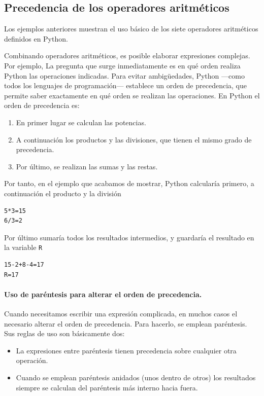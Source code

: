 \begin{paracol}{2}
\subsection{Precedencia de los operadores aritméticos}
Los ejemplos anteriores muestran el uso básico de los siete operadores aritméticos definidos en Python. 
 
Combinando operadores aritméticos, es posible elaborar expresiones complejas. Por ejemplo,
La pregunta que surge inmediatamente es en qué orden realiza Python las operaciones indicadas. Para evitar ambigüedades, Python ---como todos los lenguajes de programación--- establece un orden de precedencia, que permite saber exactamente en qué orden se realizan las operaciones. En Python el orden de precedencia es:
\begin{enumerate}
\item En primer lugar se calculan las potencias.
\item A continuación los productos y las divisiones, que tienen el mismo grado de precedencia.
\item Por último, se realizan las sumas y las restas. 
\end{enumerate} 

Por tanto, en el ejemplo que acabamos de mostrar, Python calcularía primero,
a continuación el producto y la división
\begin{verbatim}
5*3=15
6/3=2
\end{verbatim}
Por último sumaría todos los resultados intermedios, y guardaría el resultado en la variable \texttt{R}
\begin{verbatim}
15-2+8-4=17
R=17
\end{verbatim}

\paragraph{Uso de paréntesis para alterar el orden de precedencia.}
Cuando necesitamos escribir una expresión complicada, en muchos casos el necesario alterar el orden de precedencia. Para hacerlo, se emplean paréntesis. Sus reglas de uso son básicamente dos:
\begin{itemize}
\item La expresiones entre paréntesis tienen precedencia sobre cualquier otra operación.
\item Cuando se emplean paréntesis anidados (unos dentro de otros) los resultados siempre se calculan del paréntesis más interno hacia fuera.
\end{itemize}


\end{paracol}
